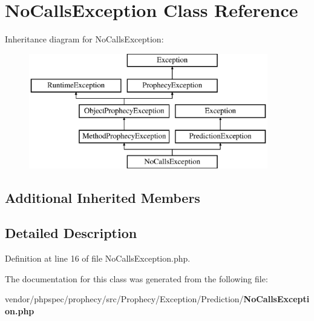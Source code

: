 \section{No\+Calls\+Exception Class Reference}
\label{class_prophecy_1_1_exception_1_1_prediction_1_1_no_calls_exception}
Inheritance diagram for No\+Calls\+Exception\+:\begin{figure}[H]
\begin{center}
\leavevmode
\includegraphics[height=5.000000cm]{class_prophecy_1_1_exception_1_1_prediction_1_1_no_calls_exception}
\end{center}
\end{figure}
\subsection*{Additional Inherited Members}


\subsection{Detailed Description}


Definition at line 16 of file No\+Calls\+Exception.\+php.



The documentation for this class was generated from the following file\+:\begin{DoxyCompactItemize}
\item 
vendor/phpspec/prophecy/src/\+Prophecy/\+Exception/\+Prediction/{\bf No\+Calls\+Exception.\+php}\end{DoxyCompactItemize}
